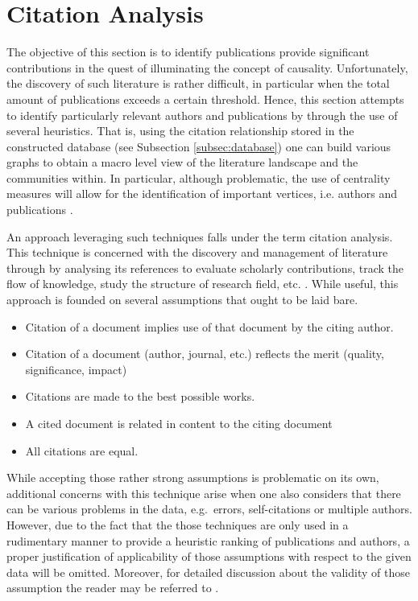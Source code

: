 \documentclass[11pt,a4paper]{book}
\theoremstyle{definition}
\theoremstyle{definition}
\theoremstyle{definition}
\theoremstyle{remark}
\begin{document}
\section{Citation Analysis}
The objective of this section is to identify publications provide significant contributions in the quest of illuminating the concept of causality. Unfortunately, the discovery of such literature is rather difficult, in particular when the total amount of publications exceeds a certain threshold. Hence, this section attempts to identify particularly relevant authors and publications by through the use of several heuristics.
That is, using the citation relationship stored in the constructed database (see Subsection \ref{subsec:database}) one can build various graphs to obtain a macro level view of the literature landscape and the communities within. In particular, although problematic, the use of centrality measures will allow for the identification of important vertices, i.e. authors and publications  \parencite{meho2007rise,mingers2015review,leydesdorff2012scientometrics}.



An approach leveraging such techniques falls under the term citation analysis. This technique is concerned with the discovery and management of literature through by analysing its references to evaluate scholarly contributions, track the flow of knowledge, study the structure of research field, etc. \parencite[p.~1-5]{zhao2015analysis}. While useful, this approach is founded on several assumptions that ought to be laid bare.
\begin{itemize}
\item Citation of a document implies use of that document by the citing author.
\item Citation of a document (author, journal, etc.) reflects the merit (quality, significance, impact)
\item Citations are made to the best possible works.
\item A cited document is related in content to the citing document
\item All citations are equal.
\end{itemize}
While accepting those rather strong assumptions is problematic on its own, additional concerns with this technique arise when one also considers that there can be various problems in the data, e.g.\ errors, self-citations or multiple authors. However, due to the fact that the those techniques are only used in a rudimentary manner to provide a heuristic ranking of publications and authors, a proper justification of applicability of those assumptions with respect to the given data will be omitted. Moreover, for detailed discussion about the validity of those assumption the reader may be referred to \parencite{smith1981citation}.\\
\end{document}
